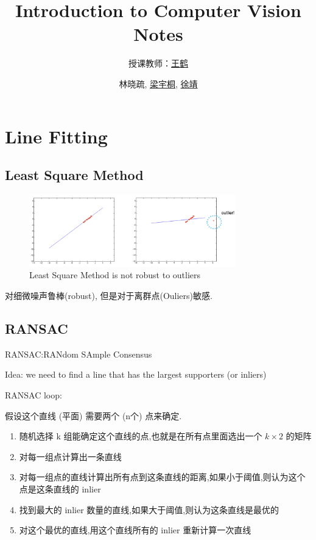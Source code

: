 \documentclass[lang=cn,10pt,green]{elegantbook}
\title{Introduction to Computer Vision Notes}
\subtitle{授课教师：\href{https://hughw19.github.io}{王鹤}}
\author{林晓疏, \href{https://lyt0112.com/}{梁宇桐}, \href{https://iculizhi.github.io/}{徐靖}}
\institute{PKU EECS}
\begin{document}
\maketitle
\frontmatter

\tableofcontents

\mainmatter

\chapter{Line Fitting}

\section{Least Square Method}

\begin{figure}[htbp]
    \centering
    \includegraphics[width=0.8\textwidth]{figures/not_roboust_outliner.png}
    \caption{Least Square Method is not robust to outliers}
\end{figure}

对细微噪声鲁棒(robust), 但是对于离群点(Ouliers)敏感.

\section{RANSAC}

RANSAC:RANdom SAmple Consensus

Idea: we need to ﬁnd a line that has the largest supporters (or inliers)

RANSAC loop:

假设这个直线 (平面) 需要两个 (n个) 点来确定.

\begin{enumerate}
    \item 随机选择 k 组能确定这个直线的点,也就是在所有点里面选出一个 $k\times 2$ 的矩阵
    \item 对每一组点计算出一条直线
    \item 对每一组点的直线计算出所有点到这条直线的距离,如果小于阈值,则认为这个点是这条直线的 inlier
    \item 找到最大的 inlier 数量的直线,如果大于阈值,则认为这条直线是最优的
    \item 对这个最优的直线,用这个直线所有的 inlier 重新计算一次直线
\end{enumerate}
\end{document}
